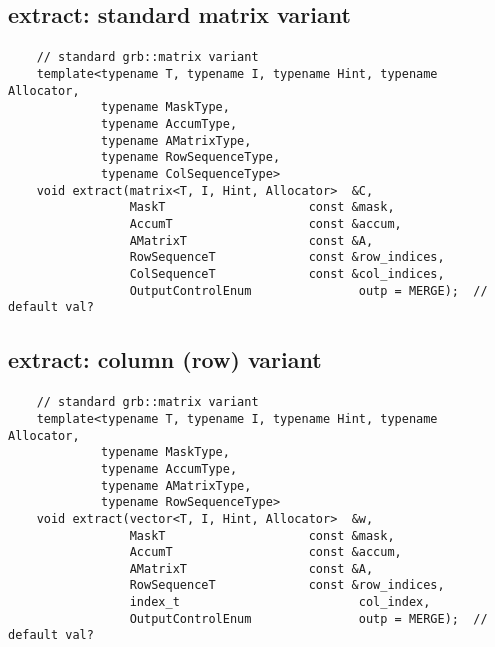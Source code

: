 \subsection{{\sf extract}: standard matrix variant}

\paragraph{\syntax}

\begin{verbatim}
    // standard grb::matrix variant
    template<typename T, typename I, typename Hint, typename Allocator,
             typename MaskType,
             typename AccumType,
             typename AMatrixType,
             typename RowSequenceType,
             typename ColSequenceType>
    void extract(matrix<T, I, Hint, Allocator>  &C,
                 MaskT                    const &mask,
                 AccumT                   const &accum,
                 AMatrixT                 const &A,
                 RowSequenceT             const &row_indices,
                 ColSequenceT             const &col_indices,
                 OutputControlEnum               outp = MERGE);  // default val?
\end{verbatim}

\subsection{{\sf extract}: column (row) variant}

\paragraph{\syntax}

\begin{verbatim}
    // standard grb::matrix variant
    template<typename T, typename I, typename Hint, typename Allocator,
             typename MaskType,
             typename AccumType,
             typename AMatrixType,
             typename RowSequenceType>
    void extract(vector<T, I, Hint, Allocator>  &w,
                 MaskT                    const &mask,
                 AccumT                   const &accum,
                 AMatrixT                 const &A,
                 RowSequenceT             const &row_indices,
                 index_t                         col_index,
                 OutputControlEnum               outp = MERGE);  // default val?
\end{verbatim}



